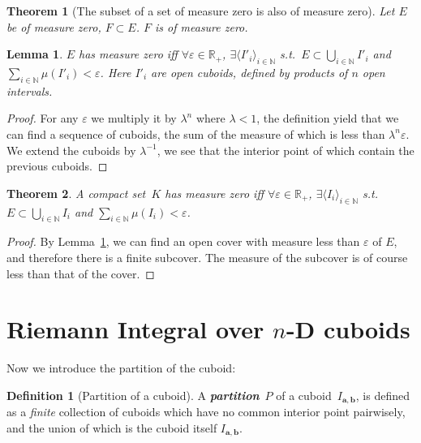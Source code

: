 \documentclass[openany]{book}
\newcommand*{\indexbf}[1]{\emph{\textbf{#1}}\index{#1}} %
\theoremstyle{plain}
\newtheorem{theorem}{Theorem}[section] %
\newtheorem{lemma}{Lemma} %
\theoremstyle{definition}
\newtheorem{definition}{Definition}[section] %
\newcommand*{\bv}{\boldsymbol} %
\begin{document}
\begin{theorem}[The subset of a set of measure zero is also of measure zero]
	\label{theorem: the subset of a set of measure zero is also of measure zero}
	Let $E$ be of measure zero, $F \subset E$. $F$ is of measure zero.
\end{theorem}

\begin{lemma}
	\label{lemma: zero measure defined by open cuboids}
	$E$ has measure zero iff $\forall \varepsilon \in \mathbb R_+$, $\exists \langle I'_i\rangle_{i \in \mathbb N}$ s.t.\ $E \subset \bigcup_{i \in \mathbb N} I'_i$ and $\sum_{i \in \mathbb N} \mu(I'_i) < \varepsilon$.
	Here $I'_i$ are open cuboids, defined by products of $n$ open intervals. 
\end{lemma}
\begin{proof}
	For any $\varepsilon$ we multiply it by $\lambda^n$ where $\lambda < 1$, the definition yield that we can find a sequence of cuboids, the sum of the measure of which is less than $\lambda^n \varepsilon$.
	We extend the cuboids by $\lambda^{-1}$, we see that the interior point of which contain the previous cuboids.
\end{proof}

\begin{theorem}
	\label{theorem: compact zero measure defined by finite cuboids}
	A compact set~$K$ has measure zero iff $\forall \varepsilon \in \mathbb R_+$, $\exists \langle I_i\rangle_{i \in \mathbb N}$ s.t.\ $E \subset \bigcup_{i \in \mathbb N} I_i$ and $\sum_{i \in \mathbb N} \mu(I_i) < \varepsilon$. 
\end{theorem}
\begin{proof}
	By Lemma~\ref{lemma: zero measure defined by open cuboids}, we can find an open cover with measure less than $\varepsilon$ of $E$, and therefore there is a finite subcover. 
	The measure of the subcover is of course less than that of the cover. 
\end{proof}

\section{\texorpdfstring{Riemann Integral over $n$-D cuboids}{Riemann Integral over n-D cuboids}}

Now we introduce the partition of the cuboid: 
\begin{definition}[Partition of a cuboid]
	A \indexbf{partition}~$P$ of a cuboid~$I_{\bv a, \bv b}$, is defined as a \emph{finite} collection of cuboids which have no common interior point pairwisely, and the union of which is the cuboid itself $I_{\bv a, \bv b}$.
\end{definition}
\end{document}
